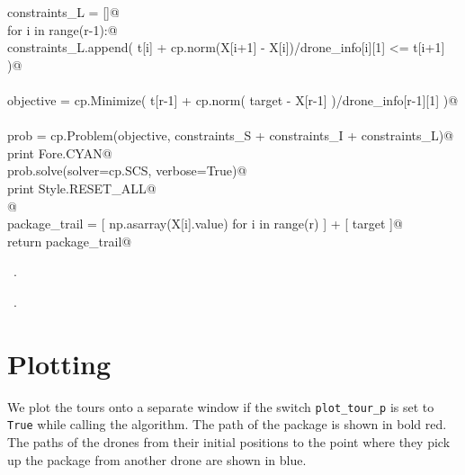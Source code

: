 \documentclass[10.0pt]{report}
\begin{document}
\begin{flushleft}
\begin{list}{}{}
\mbox{}\verb@    constraints_L = []@\\
\mbox{}\verb@    for i in range(r-1):@\\
\mbox{}\verb@         constraints_L.append( t[i] + cp.norm(X[i+1] - X[i])/drone_info[i][1] <= t[i+1] )@\\
\mbox{}\verb@@\\
\mbox{}\verb@    objective = cp.Minimize(  t[r-1]  + cp.norm( target - X[r-1]  )/drone_info[r-1][1]  )@\\
\mbox{}\verb@@\\
\mbox{}\verb@    prob = cp.Problem(objective, constraints_S + constraints_I + constraints_L)@\\
\mbox{}\verb@    print Fore.CYAN@\\
\mbox{}\verb@    prob.solve(solver=cp.SCS, verbose=True)@\\
\mbox{}\verb@    print Style.RESET_ALL@\\
\mbox{}\verb@    @\\
\mbox{}\verb@    package_trail = [ np.asarray(X[i].value) for i in range(r) ] + [ target ]@\\
\mbox{}\verb@    return package_trail@\\
\mbox{}\verb@@{\NWsep}
\end{list}
\vspace{-1.5ex}
\footnotesize
\begin{list}{}{\setlength{\itemsep}{-\parsep}\setlength{\itemindent}{-\leftmargin}}
\item \NWtxtMacroDefBy\ .
\item \NWtxtMacroRefIn\ .

\item{}
\end{list}
\vspace{4ex}
\end{flushleft}

\section{Plotting}

We plot the tours onto a separate window if the switch \verb|plot_tour_p| is set to \verb|True| 
while calling the algorithm. The path of the package is shown in bold red. The paths of the drones 
from their initial positions to the point where they pick up the package from another drone 
are shown in blue.
\end{document}
